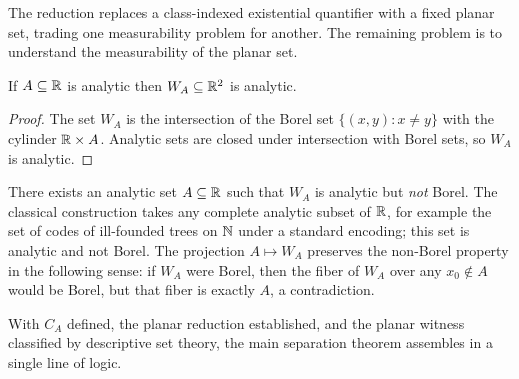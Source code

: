 The reduction replaces a class-indexed existential quantifier with a
fixed planar set, trading one measurability problem for another. The
remaining problem is to understand the measurability of the planar
set.

\begin{thm}
\label{thm:planar-analytic}
  \leanok
If $A \subseteq \mathbb{R}$ is analytic then $W_A \subseteq \mathbb{R}^2$ is analytic.
\end{thm}

\begin{proof}
The set $W_A$ is the intersection of the Borel set
$\{(x, y) : x \neq y\}$ with the cylinder $\mathbb{R} \times A$. Analytic
sets are closed under intersection with Borel sets, so $W_A$ is
analytic.
\end{proof}

\begin{thm}
\label{thm:planar-not-borel}
  \leanok
There exists an analytic set $A \subseteq \mathbb{R}$ such that $W_A$ is
analytic but \emph{not} Borel. The classical construction takes any
complete analytic subset of $\mathbb{R}$, for example the set of codes of
ill-founded trees on $\mathbb{N}$ under a standard encoding; this set is
analytic and not Borel. The projection
$A \mapsto W_A$ preserves the non-Borel property in the following
sense: if $W_A$ were Borel, then the fiber of $W_A$ over any
$x_0 \notin A$ would be Borel, but that fiber is exactly $A$, a
contradiction.
\end{thm}

With $C_A$ defined, the planar reduction established, and the planar
witness classified by descriptive set theory, the main separation
theorem assembles in a single line of logic.

